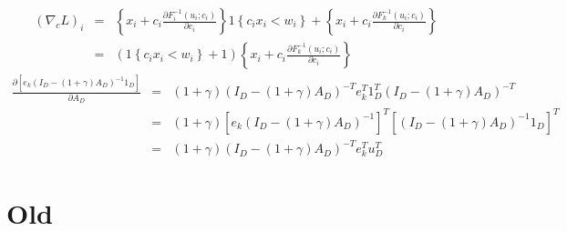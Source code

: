 \documentclass{article}
\begin{document}
\begin{eqnarray*}
\left( \nabla _{c}L\right) _{i} &=&\left\{ x_{i}+c_{i}\frac{\partial
F_{i}^{-1}\left( u_{i};c_{i}\right) }{\partial c_{i}}\right\} 1\left\{
c_{i}x_{i}<w_{i}\right\} +\left\{ x_{i}+c_{i}\frac{\partial F_{k}^{-1}\left(
u_{i};c_{i}\right) }{\partial c_{i}}\right\}  \\
&=&\left( 1\left\{ c_{i}x_{i}<w_{i}\right\} +1\right) \left\{ x_{i}+c_{i}%
\frac{\partial F_{k}^{-1}\left( u_{i};c_{i}\right) }{\partial c_{i}}\right\} 
\end{eqnarray*}%
\begin{eqnarray*}
\frac{\partial \left[ e_{k}\left( I_{D}-\left( 1+\gamma \right) A_{D}\right)
^{-1}1_{D}\right] }{\partial A_{D}} &=&\left( 1+\gamma \right) \left(
I_{D}-\left( 1+\gamma \right) A_{D}\right) ^{-T}e_{k}^{T}1_{D}^{T}\left(
I_{D}-\left( 1+\gamma \right) A_{D}\right) ^{-T} \\
&=&\left( 1+\gamma \right) \left[ e_{k}\left( I_{D}-\left( 1+\gamma \right)
A_{D}\right) ^{-1}\right] ^{T}\left[ \left( I_{D}-\left( 1+\gamma \right)
A_{D}\right) ^{-1}1_{D}\right] ^{T} \\
&=&\left( 1+\gamma \right) \left( I_{D}-\left( 1+\gamma \right) A_{D}\right)
^{-T}e_{k}^{T}u_{D}^{T}
\end{eqnarray*}

\section{Old}
\end{document}

